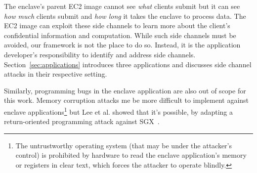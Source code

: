 The enclave's parent EC2 image cannot see \emph{what} clients submit but it can
see \emph{how much} clients submit and \emph{how long} it takes the enclave to
process data.  The EC2 image can exploit these side channels to learn more
about the client's confidential information and computation.  While such side
channels must be avoided, our framework is not the place to do so.  Instead, it
is the application developer's responsibility to identify and address side
channels.  Section~\ref{sec:applications} introduces three applications and
discusses side channel attacks in their respective setting.

Similarly, programming bugs in the enclave application are also out of scope
for this work.  Memory corruption attacks me be more difficult to implement
against enclave applications\footnote{The untrustworthy operating system (that
may be under the attacker's control) is prohibited by hardware to read the
enclave application's memory or registers in clear text, which forces the
attacker to operate blindly.} but Lee et al. showed that it's possible, by
adapting a return-oriented programming attack against SGX~\cite{Lee2017a}.

